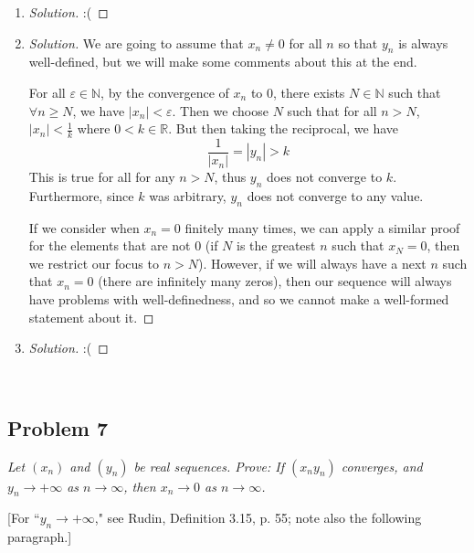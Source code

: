 \documentclass{article}
\newcommand{\N}{{\mathbb N}}
\newcommand{\R}{{\mathbb R}}
\newcommand{\ep}{{\varepsilon}}
\begin{document}
\begin{enumerate}
	\item \begin{proof}[Solution]\let\qed\relax
		:(
	\end{proof}
	\item \begin{proof}[Solution]\let\qed\relax
		We are going to assume that $x_n \neq 0$ for all $n$
		so that $y_n$ is always well-defined,
		but we will make some comments about this at the end.

		For all $\ep \in \N$,
		by the convergence of $x_n$ to $0$,
		there exists $N \in \N$ such that $\forall n \geq N$,
		we have $|x_n| < \ep$.
		Then we choose $N$ such that for all $n>N$, $|x_n| < \frac{1}{k}$ where $0 < k \in \R$.
		But then taking the reciprocal, we have
		\[
			\frac{1}{|x_n|} = |y_n| > k
		\]
		This is true for all for any $n>N$, thus $y_n$ does not converge to $k$.
		Furthermore, since $k$ was arbitrary, $y_n$ does not converge to any value.

		If we consider when $x_n = 0$ finitely many times,
		we can apply a similar proof for the elements that are not $0$
		(if $N$ is the greatest $n$ such that $x_N = 0$,
		then we restrict our focus to $n>N$).
		However, if we will always have a next $n$ such that $x_n = 0$
		(there are infinitely many zeros),
		then our sequence will always have problems with well-definedness,
		and so we cannot make a well-formed statement about it.
	\end{proof}
	\item \begin{proof}[Solution]\let\qed\relax
		:(
	\end{proof} 
\end{enumerate}
\clearpage
~\clearpage

\subsection*{Problem 7}
{\it Let $(x_n)$ and $(y_n)$ be real sequences.
Prove: If $(x_ny_n)$ converges, and $y_n \to +\infty$ as $n \to \infty$,
then $x_n \to 0$ as $n\to\infty$.
\begin{center}
	[For ``$y_n \to +\infty$," see Rudin, Definition 3.15, p. 55;
	note also the following paragraph.]
\end{center}}
\end{document}
